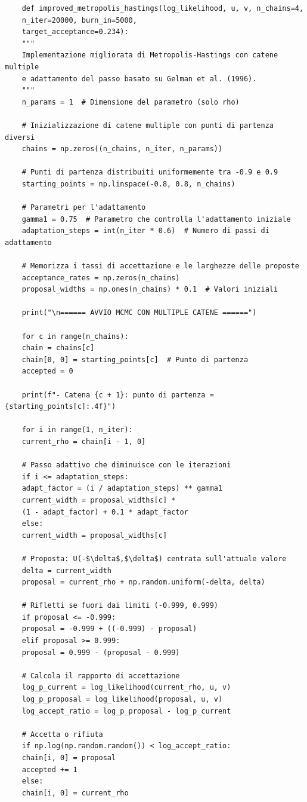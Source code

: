 \documentclass[%
	corpo=11pt,
    twoside,
    stile=classica,
    oldstyle,
    tipotesi=custom,
    greek,
    evenboxes,
]{toptesi}
\begin{document}
\begin{verbatim}
	def improved_metropolis_hastings(log_likelihood, u, v, n_chains=4, 
	n_iter=20000, burn_in=5000,
	target_acceptance=0.234):
	"""
	Implementazione migliorata di Metropolis-Hastings con catene multiple
	e adattamento del passo basato su Gelman et al. (1996).
	"""
	n_params = 1  # Dimensione del parametro (solo rho)
	
	# Inizializzazione di catene multiple con punti di partenza diversi
	chains = np.zeros((n_chains, n_iter, n_params))
	
	# Punti di partenza distribuiti uniformemente tra -0.9 e 0.9
	starting_points = np.linspace(-0.8, 0.8, n_chains)
	
	# Parametri per l'adattamento
	gamma1 = 0.75  # Parametro che controlla l'adattamento iniziale
	adaptation_steps = int(n_iter * 0.6)  # Numero di passi di adattamento
	
	# Memorizza i tassi di accettazione e le larghezze delle proposte
	acceptance_rates = np.zeros(n_chains)
	proposal_widths = np.ones(n_chains) * 0.1  # Valori iniziali
	
	print("\n====== AVVIO MCMC CON MULTIPLE CATENE ======")
	
	for c in range(n_chains):
	chain = chains[c]
	chain[0, 0] = starting_points[c]  # Punto di partenza
	accepted = 0
	
	print(f"- Catena {c + 1}: punto di partenza = {starting_points[c]:.4f}")
	
	for i in range(1, n_iter):
	current_rho = chain[i - 1, 0]
	
	# Passo adattivo che diminuisce con le iterazioni
	if i <= adaptation_steps:
	adapt_factor = (i / adaptation_steps) ** gamma1
	current_width = proposal_widths[c] * 
	(1 - adapt_factor) + 0.1 * adapt_factor
	else:
	current_width = proposal_widths[c]
	
	# Proposta: U(-$\delta$,$\delta$) centrata sull'attuale valore
	delta = current_width
	proposal = current_rho + np.random.uniform(-delta, delta)
	
	# Rifletti se fuori dai limiti (-0.999, 0.999)
	if proposal <= -0.999:
	proposal = -0.999 + ((-0.999) - proposal)
	elif proposal >= 0.999:
	proposal = 0.999 - (proposal - 0.999)
	
	# Calcola il rapporto di accettazione
	log_p_current = log_likelihood(current_rho, u, v)
	log_p_proposal = log_likelihood(proposal, u, v)
	log_accept_ratio = log_p_proposal - log_p_current
	
	# Accetta o rifiuta
	if np.log(np.random.random()) < log_accept_ratio:
	chain[i, 0] = proposal
	accepted += 1
	else:
	chain[i, 0] = current_rho
	

\end{verbatim}
\end{document}
